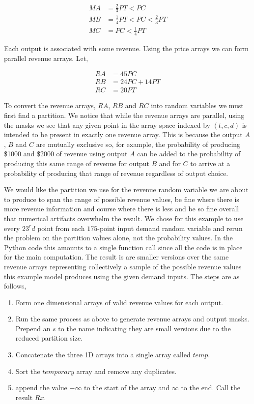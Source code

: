 \begin{align*}
MA &= \frac{2}{3}PT < PC\\
MB &= \frac{1}{4}PT < PC < \frac{2}{3}PT\\
MC &= PC < \frac{1}{4}PT
\end{align*}

Each output is associated with some revenue. Using the price arrays
we can form parallel revenue arrays. Let,

\begin{align*}
RA &= 45PC\\
RB &= 24PC + 14PT\\
RC &= 20PT
\end{align*}

To convert  the revenue arrays, $RA$, $RB$ and $RC$ into random
variables we must first find a partition. We notice that while the
revenue arrays are parallel, using the masks we see that any given
point in the array space indexed by $(t,c,d)$ is intended to be
present in exactly one revenue array. This is because the output $A$,
$B$ and $C$ are mutually exclusive so, for example, the probability of
producing \$1000 and \$2000 of revenue using output $A$ can be added
to the probability of producing this same range of revenue for output
$B$ and for $C$ to arrive at a probability of producing that range of
revenue regardless of output choice. 

We would like the partition we use for the revenue random variable we
are about to produce to span the range of possible revenue values, be
fine where there is more revenue information and course where there is
less and be so fine overall that numerical artifacts overwhelm the
result. We chose for this example to use every $23^rd$ point from each
$175$-point input demand random variable and rerun the problem on the
partition values alone, not the probability values. In the Python code
this amounts to a single function call since all the code is in place
for the main computation. The result is are smaller versions over the
same revenue arrays representing collectively a sample of the possible
revenue values this example model produces using the given demand
inputs. The steps are as follows,

\begin{enumerate}
\item Form one dimensional arrays of valid revenue values for each
  output.
\item Run the same process as above to generate revenue arrays and
  output masks. Prepend an $s$ to the name indicating they are small
  versions due to the reduced partition size.
\item Concatenate the three 1D arrays into a single array called $temp$.
\item Sort the $temporary$ array and remove any duplicates.
\item append the value $-\infty$ to the start of the array and
  $\infty$ to the end. Call the result $Rx$.
\end{enumerate}

